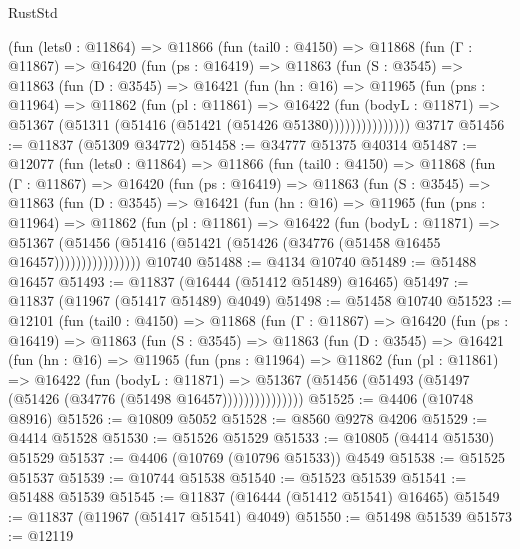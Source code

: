 \begin{lexlean}{RustStd}
\begin{coremodule}
      (fun (lets0 : @11864) =>
      @11866
        (fun (tail0 : @4150) =>
        @11868
          (fun (Γ : @11867) =>
          @16420
            (fun (ps : @16419) =>
            @11863
              (fun (S : @3545) =>
              @11863
                (fun (D : @3545) =>
                @16421
                  (fun (hn : @16) =>
                  @11965
                    (fun (pns : @11964) =>
                    @11862
                      (fun (pl : @11861) =>
                      @16422
                        (fun (bodyL : @11871) =>
                        @51367 (@51311 (@51416 (@51421 (@51426 @51380)))))))))))))))
    @3717
@51456 := @11837 (@51309 @34772)
@51458 := @34777 @51375 @40314
@51487 := @12077
    (fun (lets0 : @11864) =>
    @11866
      (fun (tail0 : @4150) =>
      @11868
        (fun (Γ : @11867) =>
        @16420
          (fun (ps : @16419) =>
          @11863
            (fun (S : @3545) =>
            @11863
              (fun (D : @3545) =>
              @16421
                (fun (hn : @16) =>
                @11965
                  (fun (pns : @11964) =>
                  @11862
                    (fun (pl : @11861) =>
                    @16422
                      (fun (bodyL : @11871) =>
                      @51367
                        (@51456
                          (@51416 (@51421 (@51426 (@34776 (@51458 @16455 @16457))))))))))))))))
    @10740
@51488 := @4134 @10740
@51489 := @51488 @16457
@51493 := @11837 (@16444 (@51412 @51489) @16465)
@51497 := @11837 (@11967 (@51417 @51489) @4049)
@51498 := @51458 @10740
@51523 := @12101
    (fun (tail0 : @4150) =>
    @11868
      (fun (Γ : @11867) =>
      @16420
        (fun (ps : @16419) =>
        @11863
          (fun (S : @3545) =>
          @11863
            (fun (D : @3545) =>
            @16421
              (fun (hn : @16) =>
              @11965
                (fun (pns : @11964) =>
                @11862
                  (fun (pl : @11861) =>
                  @16422
                    (fun (bodyL : @11871) =>
                    @51367 (@51456 (@51493 (@51497 (@51426 (@34776 (@51498 @16457)))))))))))))))
@51525 := @4406 (@10748 @8916)
@51526 := @10809 @5052
@51528 := @8560 @9278 @4206
@51529 := @4414 @51528
@51530 := @51526 @51529
@51533 := @10805 (@4414 @51530) @51529
@51537 := @4406 (@10769 (@10796 @51533)) @4549
@51538 := @51525 @51537
@51539 := @10744 @51538
@51540 := @51523 @51539
@51541 := @51488 @51539
@51545 := @11837 (@16444 (@51412 @51541) @16465)
@51549 := @11837 (@11967 (@51417 @51541) @4049)
@51550 := @51498 @51539
@51573 := @12119

\end{coremodule}
\end{lexlean}
